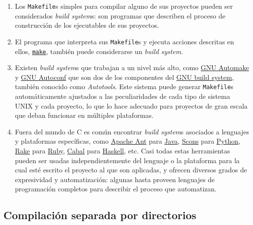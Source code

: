 \documentclass[]{article}
\begin{document}
\begin{enumerate}[1.]
  \begin{enumerate}[1.]
  \item
    Los \texttt{Makefile}s simples para compilar alguno de sus proyectos
    pueden ser considerados \emph{build system}s: son programas que
    describen el proceso de construcción de los ejecutables de sus
    proyectos.
  \item
    El programa que interpreta sus \texttt{Makefile}s y ejecuta acciones
    descritas en ellos,
    \href{https://www.gnu.org/software/make}{\texttt{make}}, también
    puede considerarse un \emph{build system}.
  \item
    Existen \emph{build system}s que trabajan a un nivel más alto, como
    \href{https://www.gnu.org/software/automake}{GNU Automake} y
    \href{https://www.gnu.org/software/autoconf}{GNU Autoconf} que son
    dos de los componentes del
    \href{https://www.gnu.org/software/automake/manual/html\_node/GNU-Build-System}{GNU
    build system}, también conocido como \emph{Autotools}. Este sistema
    puede generar \texttt{Makefile}s automáticamente ajustados a las
    peculiaridades de cada tipo de sistema UNIX y cada proyecto, lo que
    lo hace adecuado para proyectos de gran escala que deban funcionar
    en múltiples plataformas.
  \item
    Fuera del mundo de C es común encontrar \emph{build system}s
    asociados a lenguajes y plataformas específicas, como
    \href{https://ant.apache.org/}{Apache Ant} para
    \href{https://java.com/}{Java}, \href{http://scons.org/}{Scons} para
    \href{http://python.org/}{Python},
    \href{http://rake.rubyforge.org/}{Rake} para
    \href{http://www.ruby-lang.org/}{Ruby},
    \href{http://haskell.org/cabal/}{Cabal} para
    \href{http://haskell.org/}{Haskell}, etc. Casi todas estas
    herramientas pueden ser usadas independientemente del lenguaje o la
    plataforma para la cual esté escrito el proyecto al que son
    aplicadas, y ofrecen diversos grados de expresividad y
    automatización: algunas hasta proveen lenguajes de programación
    completos para describir el proceso que automatizan.
  \end{enumerate}
\end{enumerate}
\subsection{Compilación separada por directorios}
\end{document}
